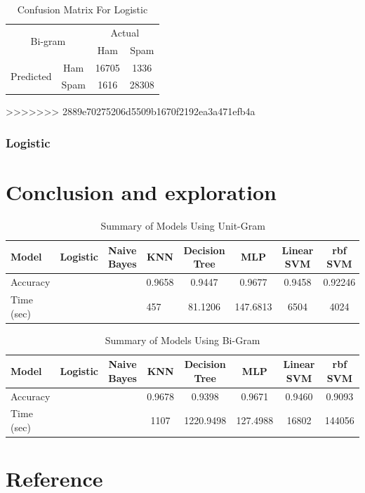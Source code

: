 \documentclass[12pt]{article}
\begin{document}
\begin{table}[H]
\begin{floatrow}
{\begin{subtable}{.5\textwidth}
\begin{tabular}{@{}|c|c|c|c|@{}}
					\multicolumn{2}{|c|}{\multirow{2}{*}{Bi-gram}} & \multicolumn{2}{c|}{Actual} \\ \cmidrule(l){3-4} 
					\multicolumn{2}{|c|}{}                        & Ham          & Spam         \\ \midrule
					\multirow{2}{*}{Predicted}       & Ham        & 16705        & 1336          \\ \cmidrule(l){2-4} 
					& Spam       & 1616          & 28308        \\ \bottomrule
				\end{tabular}
			\end{subtable}
		}{  
			\caption{Confusion Matrix For Logistic}  
			\label{Confusion_Logistic}  
		}  
	\end{floatrow}
\end{table} 




>>>>>>> 2889e70275206d5509b1670f2192ea3a471efb4a
\subsubsection{Logistic}


\section{Conclusion and exploration}


\begin{table}[H]
	\centering
	\caption{Summary of Models Using Unit-Gram}
	\label{Summary-one-gram}
	\begin{tabular}{lccccccc}
		\hline
		Model      & Logistic             & Naive Bayes          & KNN                     & Decision Tree & MLP                  & Linear SVM & rbf SVM \\ \hline
		Accuracy   &                      &                      & 0.9658                  & 0.9447        &        0.9677              & 0.9458     & 0.92246 \\
		Time (sec) & \multicolumn{1}{l}{} & \multicolumn{1}{l}{} & \multicolumn{1}{l}{457} & 81.1206       & \multicolumn{1}{l}{147.6813} & 6504       & 4024    \\ \hline
	\end{tabular}
\end{table}


\begin{table}[H]
	\centering
	\caption{Summary of Models Using Bi-Gram}
	\label{Summary-bi-gram}
	\begin{tabular}{lccccccc}
		\hline
		Model      & Logistic & Naive Bayes & KNN    & Decision Tree & MLP & Linear SVM & rbf SVM \\ \hline
		Accuracy   &          &             & 0.9678 & 0.9398        &     0.9671 & 0.9460     & 0.9093  \\
		Time (sec) &          &             & 1107   & 1220.9498     &    127.4988 & 16802      & 144056  \\ \hline
	\end{tabular}
\end{table}

\section{Reference}
\end{document}
